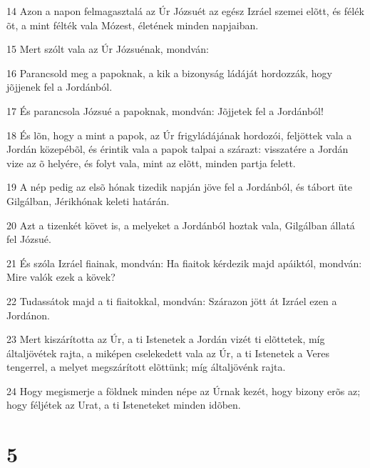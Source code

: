 \par 14 Azon a napon felmagasztalá az Úr Józsuét az egész Izráel szemei elõtt, és félék õt, a mint félték vala Mózest, életének minden napjaiban.
\par 15 Mert szólt vala az Úr Józsuénak, mondván:
\par 16 Parancsold meg a papoknak, a kik a bizonyság ládáját hordozzák, hogy jõjjenek fel a Jordánból.
\par 17 És parancsola Józsué a papoknak, mondván: Jõjjetek fel a Jordánból!
\par 18 És lõn, hogy a mint a papok, az Úr frigyládájának hordozói, feljöttek vala a Jordán közepébõl, és érintik vala a papok talpai a szárazt: visszatére a Jordán vize az õ helyére, és folyt vala, mint az elõtt, minden partja felett.
\par 19 A nép pedig az elsõ hónak tizedik napján jöve fel a Jordánból, és tábort üte Gilgálban, Jérikhónak keleti határán.
\par 20 Azt a tizenkét követ is, a melyeket a Jordánból hoztak vala, Gilgálban állatá fel Józsué.
\par 21 És szóla Izráel fiainak, mondván: Ha fiaitok kérdezik majd apáiktól, mondván: Mire valók ezek a kövek?
\par 22 Tudassátok majd a ti fiaitokkal, mondván: Szárazon jött át Izráel ezen a Jordánon.
\par 23 Mert kiszárította az Úr, a ti Istenetek a Jordán vizét ti elõttetek, míg általjövétek rajta, a miképen cselekedett vala az Úr, a ti Istenetek a Veres tengerrel, a melyet megszárított elõttünk; míg általjövénk rajta.
\par 24 Hogy megismerje a földnek minden népe az Úrnak kezét, hogy bizony erõs az; hogy féljétek az Urat, a ti Isteneteket minden idõben.

\chapter{5}

